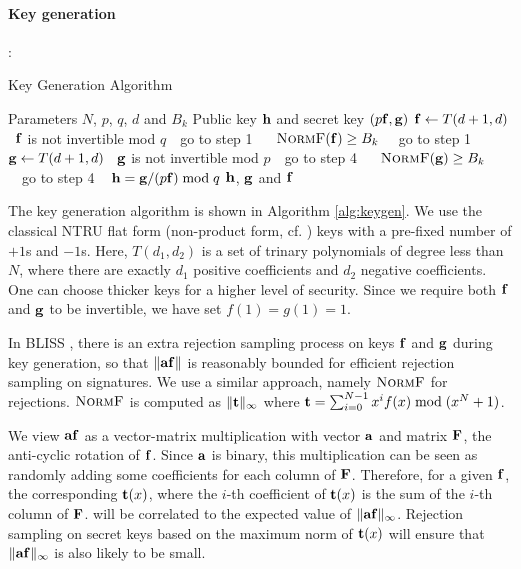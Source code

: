 \documentclass{llncs}
\newcommand{\bfa}{{\bf a}}
\newcommand{\bff}{{\bf f}}
\newcommand{\bfg}{{\bf g}}
\newcommand{\bfh}{{\bf h}}
\newcommand{\bft}{{\bf t}}
\newcommand{\bfF}{{\bf F}}
\newcommand{\<}{\langle}
\renewcommand{\>}{\rangle}
\newcommand{\LineIf}[2]{ \STATE \algorithmicif\ {#1}\ \algorithmicthen\ {#2} \algorithmicend\ \algorithmicif }
\begin{document}
\paragraph{Key generation}:
\begin{algorithm}
\caption{Key Generation Algorithm}
\begin{algorithmic}[1]\label{alg:keygen}
\REQUIRE Parameters $N$, $p$, $q$, $d$ and $B_k$
\ENSURE Public key $\bfh$ and secret key $(p\bff,\bfg)$
\STATE $\bff \gets T(d+1,d)$  
\LineIf {$\bff$ is not invertible mod $q$} {go to step 1}
\LineIf {$\textsc{NormF}(\bff)\geq B_k$ } {go to step 1}
\STATE $\bfg \gets T(d+1,d)$
\LineIf {$\bfg$ is not invertible mod $p$} {go to step 4}
\LineIf {$\textsc{NormF}(\bfg)\geq B_k$ } {go to step 4}
\STATE $\bfh = \bfg/(p\bff) \bmod q$
\RETURN $\bfh$, $\bfg$ and $\bff$
\end{algorithmic}
\end{algorithm}
The key generation algorithm is shown in Algorithm \ref{alg:keygen}.
We use the classical NTRU flat form (non-product form, cf. \cite{DBLP:conf/ctrsa/HoffsteinPSSWZ17}) keys 
with a pre-fixed number of $+1$s and $-1$s. 
Here, $T(d_1,d_2)$
is a set of trinary polynomials of degree less than $N$, where there are exactly $d_1$ positive
coefficients and $d_2$ negative coefficients.
One can choose thicker
keys for a higher level of security. Since we require both
$\bff$ and $\bfg$ to be invertible, we have set $f(1) = g(1) = 1$.

In BLISS \cite{DBLP:conf/crypto/DucasDLL13}, there is an extra rejection sampling 
process on keys $\bff$ and $\bfg$ during key generation, so that $\|\bfa\bff\|$ is reasonably bounded for 
efficient rejection sampling on signatures. 
We use a similar approach, namely  $\textsc{NormF}$ for rejections. $\textsc{NormF}$
is computed as $\|\bft\|_\infty$
where $\bft = \sum_{i=0}^{N-1} x^if(x) \bmod (x^N+1)$.

We view $\bfa\bff$ as a vector-matrix multiplication with vector $\bfa$ and matrix $\bfF$, the anti-cyclic rotation of $\bff$.
Since $\bfa$ is binary, this multiplication can be seen as randomly adding some coefficients for each column of $\bfF$.
Therefore, for a given $\bff$, the 
corresponding $\bft(x)$, where
the $i$-th coefficient of $\bft(x)$ is the sum of the $i$-th column of $\bfF$.
will be correlated to the expected value of $\|\bfa\bff\|_\infty$.
Rejection sampling on secret keys based on
 the maximum norm of $\bft(x)$  will ensure that $\|\bfa\bff\|_\infty$ is also likely to be small.
\end{document}
